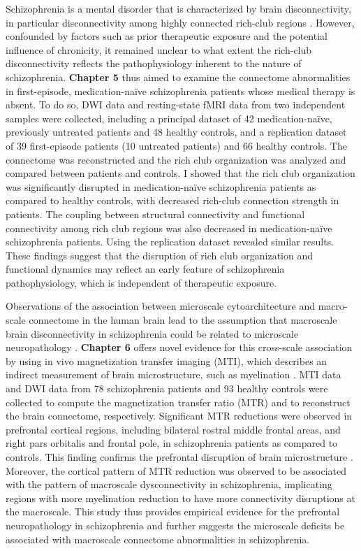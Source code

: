\begin{refsection}
Schizophrenia is a mental disorder that is characterized by brain disconnectivity, in particular disconnectivity among highly connected rich-club regions \citep{vanDenHeuvel2013AbnormalRC}. However, confounded by factors such as prior therapeutic exposure and the potential influence of chronicity, it remained unclear to what extent the rich-club disconnectivity reflects the pathophysiology inherent to the nature of schizophrenia. \textbf{Chapter 5} thus aimed to examine the connectome abnormalities in first-episode, medication-naïve schizophrenia patients whose medical therapy is absent. To do so, DWI data and resting-state fMRI data from two independent samples were collected, including a principal dataset of 42 medication-naïve, previously untreated patients and 48 healthy controls, and a replication dataset of 39 first-episode patients (10 untreated patients) and 66 healthy controls. The connectome was reconstructed and the rich club organization was analyzed and compared between patients and controls. I showed that the rich club organization was significantly disrupted in medication-naïve schizophrenia patients as compared to healthy controls, with decreased rich-club connection strength in patients. The coupling between structural connectivity and functional connectivity among rich club regions was also decreased in medication-naïve schizophrenia patients. Using the replication dataset revealed similar results. These findings suggest that the disruption of rich club organization and functional dynamics may reflect an early feature of schizophrenia pathophysiology, which is independent of therapeutic exposure.

Observations of the association between microscale cytoarchitecture and macro-scale connectome in the human brain lead to the assumption that macroscale brain disconnectivity in schizophrenia could be related to microscale neuropathology \citep{Heuvel2019MultiscaleNO}. \textbf{Chapter 6} offers novel evidence for this cross-scale association by using in vivo magnetization transfer imaging (MTI), which describes an indirect measurement of brain microstructure, such as myelination \citep{Whitaker2016AdolescenceIA}. MTI data and DWI data from 78 schizophrenia patients and 93 healthy controls were collected to compute the magnetization transfer ratio (MTR) and to reconstruct the brain connectome, respectively. Significant MTR reductions were observed in prefrontal cortical regions, including bilateral rostral middle frontal areas, and right pars orbitalis and frontal pole, in schizophrenia patients as compared to controls. This finding confirms the prefrontal disruption of brain microstructure \citep{Garey1998ReducedDS, Glantz2000DecreasedDS}. Moreover, the cortical pattern of MTR reduction was observed to be associated with the pattern of macroscale dysconnectivity in schizophrenia, implicating regions with more myelination reduction to have more connectivity disruptions at the macroscale. This study thus provides empirical evidence for the prefrontal neuropathology in schizophrenia and further suggests the microscale deficits be associated with macroscale connectome abnormalities in schizophrenia.



\end{refsection}
